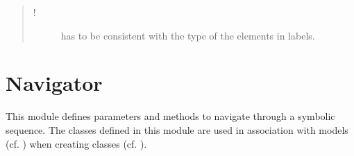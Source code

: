 \documentclass[letterpaper,10pt,english]{sphinxmanual}
\begin{document}
\begin{fulllineitems}
\begin{fulllineitems}
\begin{quote}
\begin{description}
\item[{!}] \leavevmode
{} has to be consistent with the type of the elements in labels.

\end{description}\end{quote}

\end{fulllineitems}


\begin{fulllineitems}
\label{\detokenize{index:Model.Model.print_model}}
\end{fulllineitems}


\end{fulllineitems}

\label{\detokenize{index:module-Navigator}}

\section{Navigator}
\label{\detokenize{index:navigator}}
This module defines parameters and methods to navigate through a symbolic sequence.
The classes defined in this module are used in association with models (cf. {\hyperref[\detokenize{index:module-Model}]{}}) when creating  classes (cf. ).
\end{document}

